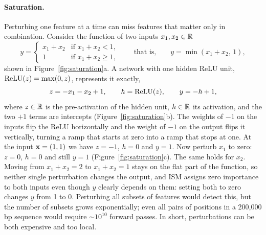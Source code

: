 \paragraph{Saturation.} Perturbing one feature at a time can miss features that matter only in combination. Consider the function of two inputs $x_1,x_2\in\mathbb{R}$
\begin{equation}
  y = \begin{cases} x_1+x_2 & \text{if } x_1+x_2<1,\\ 1 & \text{if } x_1+x_2\geq 1,\end{cases}
  \qquad\text{that is,}\qquad y=\min(x_1+x_2,\,1),
  \label{eq:sat_fn}
\end{equation}
shown in Figure~\ref{fig:saturation}a. A network with one hidden ReLU unit, $\operatorname{ReLU}(z)=\max(0,z)$, represents it exactly,
\begin{equation}
  z = -x_1 - x_2 + 1, \qquad h = \operatorname{ReLU}(z), \qquad y = -h + 1 ,
  \label{eq:sat_net}
\end{equation}
where $z\in\mathbb{R}$ is the pre-activation of the hidden unit, $h\in\mathbb{R}$ its activation, and the two $+1$ terms are intercepts (Figure~\ref{fig:saturation}b). The weights of $-1$ on the inputs flip the ReLU horizontally and the weight of $-1$ on the output flips it vertically, turning a ramp that starts at zero into a ramp that stops at one. At the input $\mathbf{x}=(1,1)$ we have $z=-1$, $h=0$ and $y=1$. Now perturb $x_1$ to zero: $z=0$, $h=0$ and still $y=1$ (Figure~\ref{fig:saturation}c). The same holds for $x_2$. Moving from $x_1+x_2=2$ to $x_1+x_2=1$ stays on the flat part of the function, so neither single perturbation changes the output, and ISM assigns zero importance to both inputs even though $y$ clearly depends on them: setting both to zero changes $y$ from 1 to 0. Perturbing all subsets of features would detect this, but the number of subsets grows exponentially; even all pairs of positions in a 200,000 bp sequence would require $\sim\!10^{10}$ forward passes. In short, perturbations can be both expensive and too local.

